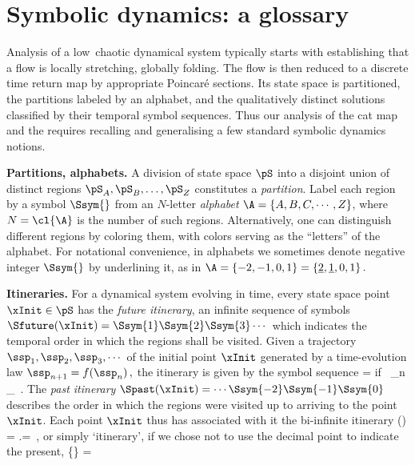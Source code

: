 
\section{Symbolic dynamics: a glossary}
\label{s-SymbDynGloss}

\renewcommand{\statesp}{state space}
\renewcommand{\Statesp}{State space}
\renewcommand{\stateDsp}{state-space}
\renewcommand{\StateDsp}{State-space}

Analysis of a low\dmn\ chaotic dynamical system typically
starts with establishing that a flow is locally stretching, globally
folding. The flow is then reduced to a discrete time return map by appropriate
Poincar\'e sections. Its state space is partitioned, the partitions labeled by an
alphabet, and the qualitatively distinct solutions classified by their temporal
symbol sequences. Thus our analysis of the cat map and the {\catlatt} requires
recalling and generalising a few standard symbolic dynamics notions.

{\bf Partitions, alphabets.}
A division of {\statesp} $\pS$ into a disjoint union of distinct regions
$\pS_A,\pS_B,\ldots,\pS_Z$ constitutes a {\em
partition}. Label each region by a symbol $\Ssym{}$ from an
$N$-letter  {\em alphabet}
$\A=\{A,B,C,\cdots,Z\}$, where $N=\cl{\A}$ is
the number of such regions. Alternatively, one can distinguish different
regions by coloring them, with colors serving as the ``letters'' of the
alphabet.
For notational convenience, in alphabets we sometimes denote negative integer
$\Ssym{}$ by underlining it, as in
\(
\A = \{ -{2}, -{1}, 0, 1\}
   = \{ \underline{2}, \underline{1}, 0, 1\}
\,.
\)


{\bf Itineraries.}
For a dynamical system evolving in time,
every {\statesp} point $\xInit \in \pS$ has the {\em future itinerary},
an infinite sequence of symbols
$\Sfuture(\xInit)=\Ssym{1}\Ssym{2}\Ssym{3}\cdots$ which indicates the
temporal order in which the regions shall be visited. Given a trajectory
$\ssp_1,\ssp_2,\ssp_3,\cdots$ of the initial point $\xInit$ generated
by a time-evolution law
\( %
   \ssp_{n+1}=f(\ssp_n)
\,,
\) %
the itinerary is given by the symbol sequence
\beq
    = \Ssym{} \qquad \mbox{if\ } \qquad  \ssp_n \in \pS_{\Ssym{}}
 \,.
The {\em past itinerary} $\Spast(\xInit)=\cdots\Ssym{-2}
\Ssym{-1}\Ssym{0} $ describes the order in which the regions were visited
up to arriving to the point $\xInit$. Each point $\xInit$ thus has
associated with it the bi-infinite itinerary
\beq
\Sbiinf(\xInit) %
        = \Spast.\Sfuture  =
\,,
or simply `itinerary', if we chose not to use the decimal point
to indicate the present,
\beq
   \{\Ssym{\zeit}\} = \cdots{} \cdots
{}


